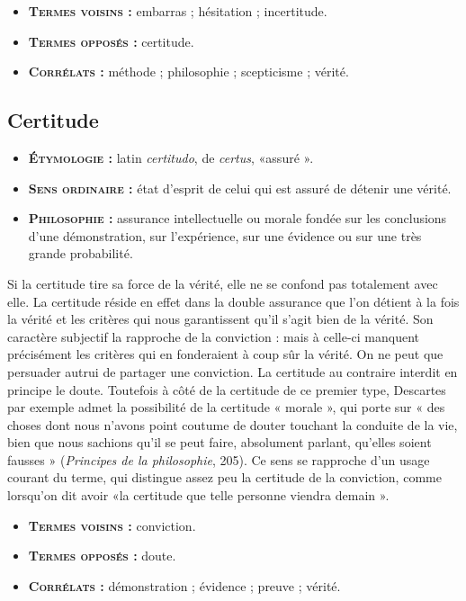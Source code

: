 {\footnotesize
\begin{itemize}[leftmargin=1cm, label=, itemsep=1pt]
\item {\bf \textsc{Termes voisins} :} embarras ; hésitation ;
incertitude.
\item {\bf \textsc{Termes opposés} :} certitude.
\item {\bf \textsc{Corrélats} :} méthode ; philosophie ;
scepticisme ; vérité.
\end{itemize}
}


\subsection{Certitude}

{\footnotesize
\begin{itemize}[leftmargin=1cm, label=, itemsep=1pt]
\item {\bf \textsc{Étymologie} :} latin {\it certitudo},
de {\it certus}, «assuré ».
\item {\bf \textsc{Sens ordinaire} :} état d'esprit
de celui qui est assuré de détenir une vérité.
\item {\bf \textsc{Philosophie} :} assurance intellectuelle
ou morale fondée sur les
conclusions d’une démonstration,
sur l'expérience, sur une évidence
ou sur une très grande probabilité.
\end{itemize}
}

Si la certitude tire sa force de la vérité,
elle ne se confond pas totalement avec
elle. La certitude réside en effet dans la
double assurance que l’on détient à la fois
la vérité et les critères qui nous garantissent
qu'il s’agit bien de la vérité. Son
caractère subjectif la rapproche de la
conviction : mais à celle-ci manquent
précisément les critères qui en fonderaient
à coup sûr la vérité. On ne peut
que persuader autrui de partager une
conviction. La certitude au contraire interdit
en principe le doute. Toutefois à côté
de la certitude de ce premier type, Descartes
par exemple admet la possibilité
de la certitude « morale », qui porte sur
« des choses dont nous n'avons point
coutume de douter touchant la conduite
de la vie, bien que nous sachions qu'il se
peut faire, absolument parlant, qu'elles
soient fausses » ({\it Principes de la
philosophie}, 205). Ce sens se rapproche d'un
usage courant du terme, qui distingue
assez peu la certitude de la conviction,
comme lorsqu'on dit avoir «la certitude
que telle personne viendra demain ».

{\footnotesize
\begin{itemize}[leftmargin=1cm, label=, itemsep=1pt]
\item {\bf \textsc{Termes voisins} :} conviction.
\item {\bf \textsc{Termes opposés} :} doute.
\item {\bf \textsc{Corrélats} :} démonstration ;
évidence ; preuve ; vérité.
\end{itemize}
}


